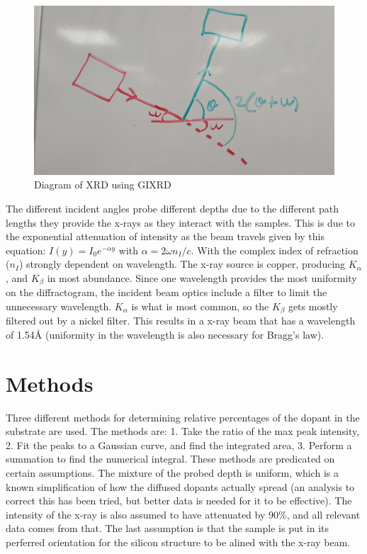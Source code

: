 \documentclass{article}
\begin{document}
\begin{multicols}{2}
\begin{figure}[H]
    \centering
    \includegraphics[width=\linewidth]{2theta scan diagram.jpg}
    \caption{Diagram of XRD using GIXRD}
    \label{fig:GIXRD diagram}
\end{figure}

    The different incident angles probe different depths due to the different 
    path lengths they provide the x-rays as they interact with the samples. This 
    is due to the exponential attenuation of intensity as the beam travels given 
    by this equation: $I(y)=I_0e^{-\alpha y}$ with $\alpha=2\omega n_I/c$. With 
    the complex index of refraction ($n_I$) strongly dependent on wavelength. 
    The x-ray source is copper, producing $K_\alpha$, and $K_\beta$ in most 
    abundance. Since one wavelength provides the most uniformity on the diffractogram, 
    the incident beam optics include a filter to limit the unnecessary wavelength. 
    $K_\alpha$ is what is most common, so the $K_\beta$ gets mostly filtered out by a
     nickel filter. This results in a x-ray beam that has a wavelength of 1.54\AA
      \space (uniformity in the wavelength is also necessary for Bragg's law).
    
\section{Methods}

    Three different methods for determining relative percentages of the dopant
     in the substrate are used. The methods are: 1. Take the ratio of the max 
     peak intensity, 2. Fit the peaks to a Gaussian curve, and find the integrated 
     area, 3. Perform a summation to find the numerical integral. These methods 
     are predicated on certain assumptions. The mixture of the probed depth is 
     uniform, which is a known simplification of how the diffused dopants actually 
     spread (an analysis to correct this has been tried, but better data is needed 
     for it to be effective). The intensity of the x-ray is also assumed to have 
     attenuated by 90\%, and all relevant data comes from that. The last assumption 
     is that the sample is put in its perferred orientation for the silicon structure 
     to be alined with the x-ray beam.


\end{multicols}
\end{document}
